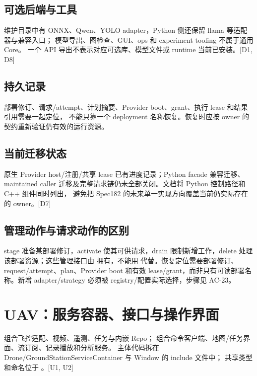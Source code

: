\subsection{可选后端与工具}
维护目录中有 ONNX、Qwen、YOLO adapter，Python 侧还保留 llama 等适配器与兼容入口；
模型导出、图检查、GUI、ops 和 experiment tooling 不属于通用 Core。
一个 API 导出不表示对应可选库、模型文件或 runtime 当前已安装。[D1, D8]

\subsection{持久记录}
部署修订、请求/attempt、计划摘要、Provider boot、grant、执行 lease 和结果引用需要一起定位，
不能只靠一个 deployment 名称恢复。恢复时应按 owner 的契约重新验证仍有效的运行资源。

\subsection{当前迁移状态}
原生 Provider host/注册/共享 lease 已有进度记录；Python facade 兼容迁移、
maintained caller 迁移及完整请求链仍未全部关闭。文档将 Python 控制路径和 C++ 组件同时列出，
避免把 Spec182 的未来单一实现方向覆盖当前仍实际存在的 owner。[D7]


\subsection{管理动作与请求动作的区别}
stage 准备某部署修订，activate 使其可供请求，drain 限制新增工作，delete 处理该部署资源；这些管理接口由  拥有，不能用  代替。恢复定位需要部署修订、request/attempt、plan、Provider boot 和有效 lease/grant，而非只有可读部署名称。新增 adapter/strategy 必须被 registry/配置实际选择，步骤见 AC-23。

\newpage

\section{UAV：服务容器、接口与操作界面}
 组合飞控适配、视频、遥测、任务与内嵌 Repo；
 组合命令客户端、地图/任务界面、流订阅、记录播放和分析服务。
主体代码拆在 Drone/GroundStationServiceContainer 与 Window 的 include 文件中；
共享类型和命名位于 。[U1, U2]


